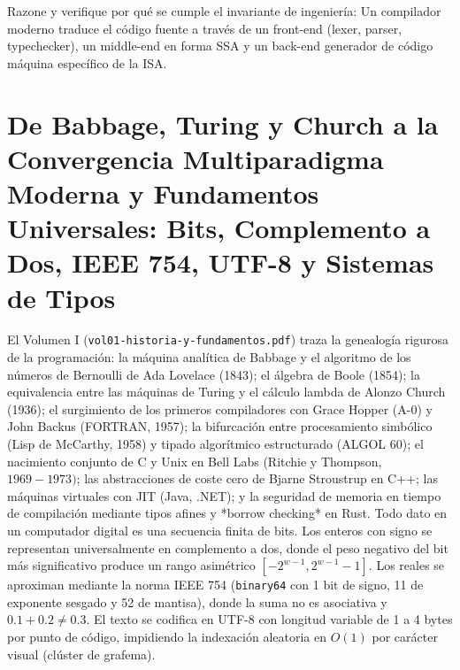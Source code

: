 \documentclass{book}
\begin{document}
\begin{tcolorbox}[title={Autoficha}, studiumcheck, breakable]

Razone y verifique por qué se cumple el invariante de ingeniería: Un compilador moderno traduce el código fuente a través de un front-end (lexer, parser, typechecker), un middle-end en forma SSA y un back-end generador de código máquina específico de la ISA.
\end{tcolorbox}

\section{De Babbage, Turing y Church a la Convergencia Multiparadigma Moderna y Fundamentos Universales: Bits, Complemento a Dos, IEEE 754, UTF-8 y Sistemas de Tipos}

El Volumen I (\texttt{vol01-historia-y-fundamentos.pdf}) traza la genealogía rigurosa de la programación: la máquina analítica de Babbage y el algoritmo de los números de Bernoulli de Ada Lovelace (1843); el álgebra de Boole (1854); la equivalencia entre las máquinas de Turing y el cálculo lambda de Alonzo Church (1936); el surgimiento de los primeros compiladores con Grace Hopper (A-0) y John Backus (FORTRAN, 1957); la bifurcación entre procesamiento simbólico (Lisp de McCarthy, 1958) y tipado algorítmico estructurado (ALGOL 60); el nacimiento conjunto de C y Unix en Bell Labs (Ritchie y Thompson, \(1969-1973)\); las abstracciones de coste cero de Bjarne Stroustrup en C++; las máquinas virtuales con JIT (Java, .NET); y la seguridad de memoria en tiempo de compilación mediante tipos afines y *borrow checking* en Rust.
Todo dato en un computador digital es una secuencia finita de bits. Los enteros con signo se representan universalmente en complemento a dos, donde el peso negativo del bit más significativo produce un rango asimétrico \([-2^{w-1}, 2^{w-1}-1]\). Los reales se aproximan mediante la norma IEEE 754 (\texttt{binary64} con 1 bit de signo, 11 de exponente sesgado y 52 de mantisa), donde la suma no es asociativa y \(0.1 + 0.2 \neq 0.3\). El texto se codifica en UTF-8 con longitud variable de 1 a 4 bytes por punto de código, impidiendo la indexación aleatoria en \(O(1)\) por carácter visual (clúster de grafema).
\end{document}
